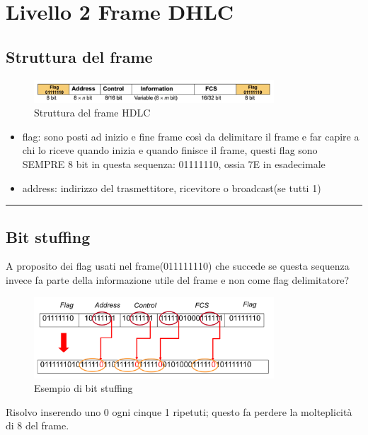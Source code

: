 \section{Livello 2 Frame DHLC}


\subsection{Struttura del frame}
\begin{figure}[h!]
    \centering
    \includegraphics[width=0.8\textwidth]{images/strutturaframe.png}
    \caption{Struttura del frame HDLC}
    \label{fig:struttura-frame}
\end{figure}
\begin{itemize}
    \item flag: sono posti ad inizio e fine frame così da delimitare il frame e far capire a chi lo riceve quando inizia e quando finisce il frame, questi flag sono SEMPRE 8 bit in questa sequenza: 
01111110, ossia 7E in esadecimale
        \item address: indirizzo del trasmettitore, ricevitore o broadcast(se tutti 1)

\end{itemize}

\vspace{1em}
\noindent\rule{\linewidth}{0.4pt}
\vspace{1em}

\subsection{Bit stuffing}
 A proposito dei flag usati nel frame(011111110) che succede se questa sequenza invece fa parte della informazione utile del frame e non come flag delimitatore?

\begin{figure}[h!]
    \centering
    \includegraphics[width=0.8\textwidth]{images/bitstuffing.png}
    \caption{Esempio di bit stuffing}
    \label{fig:bit-stuffing}
\end{figure}
Risolvo inserendo uno 0 ogni cinque 1 ripetuti; questo fa perdere la molteplicità di 8 del frame.

